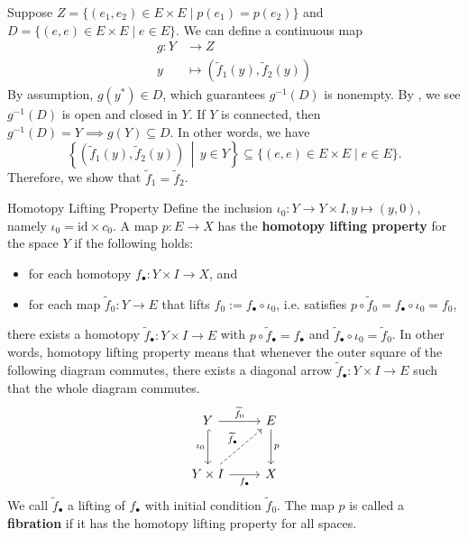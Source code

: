 \documentclass{report}
\newcommand{\midv}{\,\middle\vert\,}
\begin{document}
\begin{prf}
	Suppose $Z=\{(e_1, e_2) \in E \times E \mid p(e_1)=p(e_2)\}$ and $D=\{(e, e) \in E \times E \mid e\in E\}$. We can define a continuous map
	\begin{align*}
		g: Y & \longrightarrow Z                                               \\
		y    & \longmapsto \left(\widetilde{f}_1(y), \widetilde{f}_2(y)\right)
	\end{align*}
	By assumption, $g(y^*)\in D$, which guarantees $g^{-1}(D)$ is nonempty. By , we see $g^{-1}(D)$ is open and closed in $Y$. If $Y$ is connected, then $g^{-1}(D)=Y\implies g(Y)\subseteq D$. In other words, we have
	\[
		\left\{\left(\widetilde{f}_1(y), \widetilde{f}_2(y)\right) \midv y \in Y\right\} \subseteq\{(e, e) \in E \times E \mid e\in E\}.
	\]
	Therefore, we show that	$\widetilde{f}_1=\widetilde{f}_2$.
\end{prf}




\begin{definition}{Homotopy Lifting Property}{}
	Define the inclusion $\iota_0:Y\to Y\times I,y\mapsto(y,0)$, namely $\iota_0=\mathrm{id}\times c_0$. A map $p: E \rightarrow X$ has the \textbf{homotopy lifting property} for the space $Y$ if the following holds:
	\begin{itemize}
		\item for each homotopy $f_\bullet: Y \times I \rightarrow X$, and
		\item for each map $\widetilde{f}_0: Y \rightarrow E$ that lifts $f_0:=f_{\bullet} \circ\iota_0$, i.e. satisfies $p \circ \widetilde{f}_0=f_{\bullet} \circ\iota_0=f_0$,
	\end{itemize}
	there exists a homotopy $\widetilde{f}_{\bullet}: Y \times I \rightarrow E$ with $p \circ \widetilde{f}_{\bullet}=f_{\bullet}$ and $ \widetilde{f}_{\bullet} \circ \iota_0=\widetilde{f}_0$. In other words, homotopy lifting property means that whenever the outer square of the following diagram commutes, there exists a diagonal arrow $\widetilde{f}_{\bullet}:Y\times I\to E$ such that the whole diagram commutes.
	\[
		\begin{tikzcd}[ampersand replacement=\&]
			Y \arrow[r, "\widetilde{f}_0"] \arrow[d, "\iota_0"', hook]                      \& E \arrow[d, "p"] \\ [+10pt]
			Y\times I \arrow[r, "f_\bullet"'] \arrow[ru, "\widetilde{f}_{\bullet}", dashed] \& X
		\end{tikzcd}
	\]
	We call $\widetilde{f}_{\bullet}$ a lifting of $f_{\bullet}$ with initial condition $\widetilde{f}_0$. The map $p$ is called a \textbf{fibration} if it has the homotopy lifting property for all spaces.
\end{definition}
\end{document}
